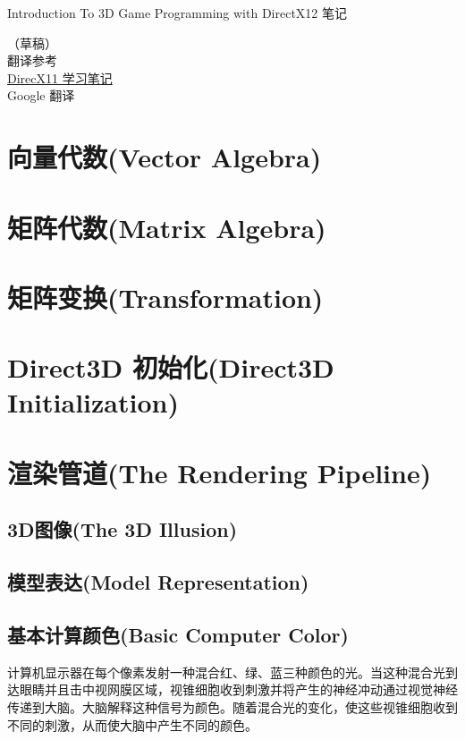 \documentclass[11pt,a4paper,oldfontcommands]{memoir}
\begin{document}
\thispagestyle{empty}
{
\sffamily
\centering
{\LARGE
Introduction To 3D Game Programming with DirectX12 笔记
}

\vspace{3.5cm}
（草稿）\\
翻译参考\\
\href{http://shiba.hpe.sh.cn/jiaoyanzu/WULI/Soft/NotXNA}{\textcolor{linkColor}{DirecX11 学习笔记}}\\
Google 翻译
\clearpage
\tableofcontents*
\clearpage
\chapter{向量代数(Vector Algebra)}
\chapter{矩阵代数(Matrix Algebra)}
\chapter{矩阵变换(Transformation)}
\chapter{Direct3D 初始化(Direct3D Initialization)}

\chapter{渲染管道(The Rendering Pipeline)}
\section{3D图像(The 3D Illusion)}
\section{模型表达(Model Representation)}
\section{基本计算颜色(Basic Computer Color)}
\begin{flushleft}
计算机显示器在每个像素发射一种混合红、绿、蓝三种颜色的光。当这种混合光到达眼睛并且击中视网膜区域，视锥细胞收到刺激并将产生的神经冲动通过视觉神经传递到大脑。大脑解释这种信号为颜色。随着混合光的变化，使这些视锥细胞收到不同的刺激，从而使大脑中产生不同的颜色。
\end{flushleft}

}
\end{document}

